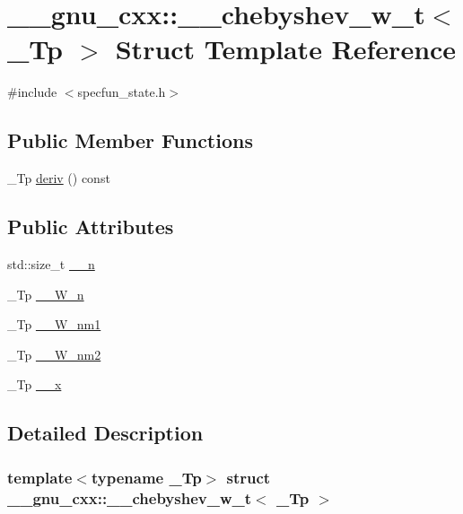 \hypertarget{struct____gnu__cxx_1_1____chebyshev__w__t}{}\section{\+\_\+\+\_\+gnu\+\_\+cxx\+:\+:\+\_\+\+\_\+chebyshev\+\_\+w\+\_\+t$<$ \+\_\+\+Tp $>$ Struct Template Reference}
\label{struct____gnu__cxx_1_1____chebyshev__w__t}


{\ttfamily \#include $<$specfun\+\_\+state.\+h$>$}

\subsection*{Public Member Functions}
\begin{DoxyCompactItemize}
\item 
\+\_\+\+Tp \hyperlink{struct____gnu__cxx_1_1____chebyshev__w__t_a12989ea093bebe65f3d35dbfe3a6dc92}{deriv} () const
\end{DoxyCompactItemize}
\subsection*{Public Attributes}
\begin{DoxyCompactItemize}
\item 
std\+::size\+\_\+t \hyperlink{struct____gnu__cxx_1_1____chebyshev__w__t_afce623f28d0c2e7fd6bb89d03e0fc645}{\+\_\+\+\_\+n}
\item 
\+\_\+\+Tp \hyperlink{struct____gnu__cxx_1_1____chebyshev__w__t_afc4ed50573ce3685a722f2a1c06c3f4a}{\+\_\+\+\_\+\+W\+\_\+n}
\item 
\+\_\+\+Tp \hyperlink{struct____gnu__cxx_1_1____chebyshev__w__t_aaae8db01cc3fd06a149999c2ca746727}{\+\_\+\+\_\+\+W\+\_\+nm1}
\item 
\+\_\+\+Tp \hyperlink{struct____gnu__cxx_1_1____chebyshev__w__t_aa57afad6442e25e0f6037c1de9fab7e8}{\+\_\+\+\_\+\+W\+\_\+nm2}
\item 
\+\_\+\+Tp \hyperlink{struct____gnu__cxx_1_1____chebyshev__w__t_a812c1414d20763ecd27f95c244a727eb}{\+\_\+\+\_\+x}
\end{DoxyCompactItemize}


\subsection{Detailed Description}
\subsubsection*{template$<$typename \+\_\+\+Tp$>$\newline
struct \+\_\+\+\_\+gnu\+\_\+cxx\+::\+\_\+\+\_\+chebyshev\+\_\+w\+\_\+t$<$ \+\_\+\+Tp $>$}

